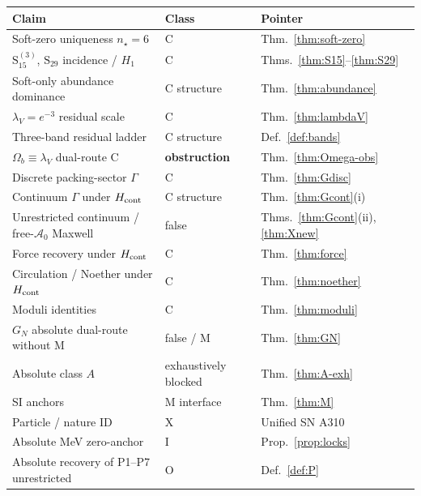 \documentclass[11pt,a4paper]{article}
\theoremstyle{remark}
\begin{document}
\begin{center}
\begin{tabular}{@{}p{5.8cm}p{2.0cm}p{4.4cm}@{}}
\toprule
\textbf{Claim} & \textbf{Class} & \textbf{Pointer} \\
\midrule
Soft-zero uniqueness $n_\star=6$ & C & Thm.~\ref{thm:soft-zero} \\
$\mathrm{S}_{15}^{(3)}$, $\mathrm{S}_{29}$ incidence / $H_1$ & C & Thms.~\ref{thm:S15}--\ref{thm:S29} \\
Soft-only abundance dominance & C structure & Thm.~\ref{thm:abundance} \\
$\lambda_V=e^{-3}$ residual scale & C & Thm.~\ref{thm:lambdaV} \\
Three-band residual ladder & C structure & Def.~\ref{def:bands} \\
$\Omega_b\equiv\lambda_V$ dual-route C & \textbf{obstruction} & Thm.~\ref{thm:Omega-obs} \\
Discrete packing-sector $\Gamma$ & C & Thm.~\ref{thm:Gdisc} \\
Continuum $\Gamma$ under $H_{\rm cont}$ & C structure & Thm.~\ref{thm:Gcont}(i) \\
Unrestricted continuum / free-$\mathcal{A}_0$ Maxwell & false & Thms.~\ref{thm:Gcont}(ii), \ref{thm:Xnew} \\
Force recovery under $H_{\rm cont}$ & C & Thm.~\ref{thm:force} \\
Circulation / Noether under $H_{\rm cont}$ & C & Thm.~\ref{thm:noether} \\
Moduli identities & C & Thm.~\ref{thm:moduli} \\
$G_N$ absolute dual-route without M & false / M & Thm.~\ref{thm:GN} \\
Absolute class $A$ & exhaustively blocked & Thm.~\ref{thm:A-exh} \\
SI anchors & M interface & Thm.~\ref{thm:M} \\
Particle / nature ID & X & Unified SN A310 \\
Absolute MeV zero-anchor & I & Prop.~\ref{prop:locks} \\
Absolute recovery of P1--P7 unrestricted & O & Def.~\ref{def:P} \\
\bottomrule
\end{tabular}
\end{center}
\end{document}
